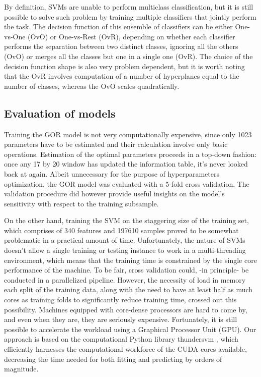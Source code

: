 \documentclass[nocrop]{bioinfo}
\begin{document}
\begin{methods}
By definition, SVMs are unable to perform multiclass classification, but it is still possible to solve such problem by training multiple classifiers that jointly perform the task.
The decision function of this ensemble of classifiers can be either One-vs-One (OvO) or One-vs-Rest (OvR), depending on whether each classifier performs the separation between two distinct classes, ignoring all the others (OvO) or merges all the classes but one in a single one (OvR). 
The choice of the decision function shape is also very problem dependent, but it is worth noting that the OvR involves computation of a number of hyperplanes equal to the number of classes, whereas the OvO scales quadratically.

\subsection*{Evaluation of models}
Training the GOR model is not very computationally expensive, since only \num{1023} parameters have to be estimated and their calculation involve only basic operations.
Estimation of the optimal parameters proceeds in a top-down fashion: once any 17 by 20 window has updated the information table, it's never looked back at again.
Albeit unnecessary for the purpose of hyperparameters optimization, the GOR model was evaluated with a 5-fold cross validation.
The validation procedure did however provide useful insights on the model's sensitivity with respect to the training subsample.

On the other hand, training the SVM on the staggering size of the training set, which comprises of 340 features and 197610 samples proved to be somewhat problematic in a practical amount of time.
Unfortunately, the nature of SVMs doesn't allow a single training or testing instance to work in a multi-threading environment, which means that the training time is constrained by the single core performance of the machine. 
To be fair, cross validation could, -in principle- be conducted in a parallelized pipeline. 
However, the necessity of load in memory each split of the training data, along with the need to have at least half as much cores as training folds to significantly reduce training time, crossed out this possibility.
Machines equipped with core-dense processors are hard to come by, and even when they are, they are seriously expensive.
Fortunately, it is still possible to accelerate the workload using a Graphical Processor Unit (GPU).
Our approach is based on the computational Python \cite{} library thundersvm \citep{wenthundersvm18}, which efficiently harnesses the computational workforce of the CUDA \citep{nickolls2008scalable} cores available, decreasing the time needed for both fitting and predicting by orders of magnitude.


\end{methods}
\end{document}
